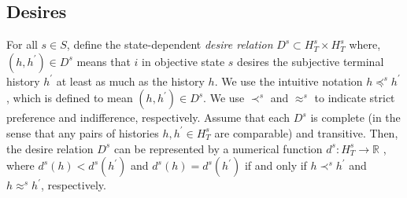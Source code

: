 \documentclass[
11pt,
titlepage,
reqno,
]{article}%
\theoremstyle{definition}
\begin{document}
%	
%	


\subsection{Desires} \label{sec: desires}
For all $s\in S$, define the state-dependent \textit{desire relation}    $D^s\subset H^s_T\times H^s_T$ where, $(h,h^{\prime})\in D^s$ means that  $i$ in objective state $s$ desires the subjective terminal history $h^{\prime}$ at least as much as the history $h$. 
We use the intuitive notation $h\preceq^s h^{\prime}$, which is defined to mean $(h,h^{\prime})\in D^s$. 
We use $\prec^s$ and $\approx^s$ to indicate strict preference and indifference, respectively. 
Assume that each $D^s$ is complete (in the sense that any pairs of histories $h,h^{\prime}\in H^s_T$ are comparable) and transitive. 
Then, the desire relation $D^s$ can be represented by a numerical function $d^s:H^s_T\rightarrow \mathbb{R}$ , where $d^s(h)< d^s(h^\prime)$ and $d^s(h)= d^s(h^\prime)$ if and only if  $h\prec^s h^{\prime}$ and $h\approx^s h^{\prime}$, respectively.
\end{document}
